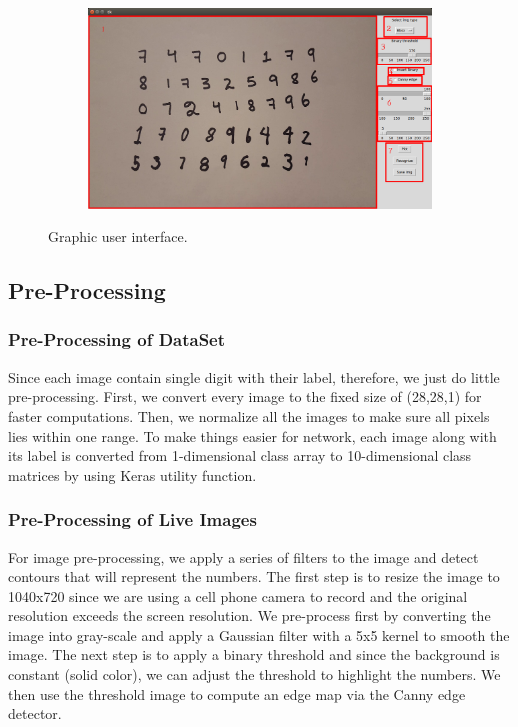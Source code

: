 \documentclass[12pt, letterpaper]{article}
\begin{document}
	
\begin{figure}[!h]
	\begin{center}	
	\begin{subfigure}{0.9\textwidth}
	\centering
	\includegraphics*[width=1 \textwidth]{tk_0152.png}
	\end{subfigure}
		
	\end{center}
	\caption{ Graphic user interface.}
	\label{fig:gui}
\end{figure}  

\subsection{Pre-Processing}

\subsubsection{Pre-Processing of DataSet}

Since each image contain single digit with their label, therefore, we just do little pre-processing. First, we convert every image to the fixed size of (28,28,1) for faster computations. Then, we normalize all the images to make sure all pixels lies within one range. To make things easier for network, each image along with its label is converted from 1-dimensional class array to 10-dimensional class matrices by using Keras utility function.

\subsubsection{Pre-Processing of Live Images} 

For image pre-processing, we apply a series of filters to the image and detect contours that will represent the numbers. The first step is to resize the image to 1040x720 since we are using a cell phone camera to record and the original resolution exceeds the screen resolution. We pre-process first by converting the image into gray-scale and apply a Gaussian filter with a 5x5 kernel to smooth the image. The next step is to apply a binary threshold and since the background is constant (solid color), we can adjust the threshold to highlight the numbers. We then use the threshold image to compute an edge map via the Canny edge detector. 
\end{document}
